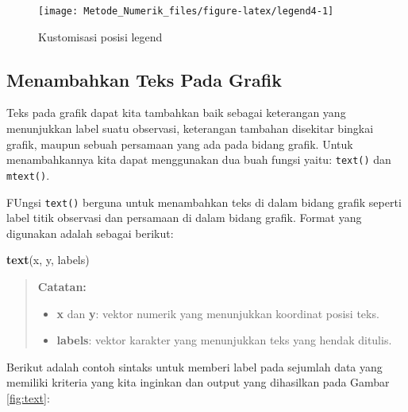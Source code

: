 \documentclass[]{book}
\newenvironment{Shaded}{\begin{snugshade}}{\end{snugshade}}
\newcommand{\KeywordTok}[1]{\textcolor[rgb]{0.13,0.29,0.53}{\textbf{#1}}}
\newcommand{\NormalTok}[1]{#1}
\providecommand{\tightlist}{%
  \setlength{\itemsep}{0pt}\setlength{\parskip}{0pt}}
\theoremstyle{definition}
\theoremstyle{definition}
\theoremstyle{definition}
\theoremstyle{remark}
\begin{document}
\begin{figure}

{\centering \texttt{[image: Metode\_Numerik\_files/figure-latex/legend4-1]} 

}

\caption{Kustomisasi posisi legend}\label{fig:legend4}
\end{figure}

\hypertarget{addtext}{%
\subsection{Menambahkan Teks Pada Grafik}\label{addtext}}

Teks pada grafik dapat kita tambahkan baik sebagai keterangan yang menunjukkan label suatu observasi, keterangan tambahan disekitar bingkai grafik, maupun sebuah persamaan yang ada pada bidang grafik. Untuk menambahkannya kita dapat menggunakan dua buah fungsi yaitu: \texttt{text()} dan \texttt{mtext()}.

FUngsi \texttt{text()} berguna untuk menambahkan teks di dalam bidang grafik seperti label titik observasi dan persamaan di dalam bidang grafik. Format yang digunakan adalah sebagai berikut:

\begin{Shaded}
\begin{Highlighting}[]
\KeywordTok{text}\NormalTok{(x, y, labels)}
\end{Highlighting}
\end{Shaded}

\begin{quote}
\textbf{Catatan:}

\begin{itemize}
\tightlist
\item
  \textbf{x} dan \textbf{y}: vektor numerik yang menunjukkan koordinat posisi teks.
\item
  \textbf{labels}: vektor karakter yang menunjukkan teks yang hendak ditulis.
\end{itemize}
\end{quote}

Berikut adalah contoh sintaks untuk memberi label pada sejumlah data yang memiliki kriteria yang kita inginkan dan output yang dihasilkan pada Gambar \ref{fig:text}:
\end{document}
